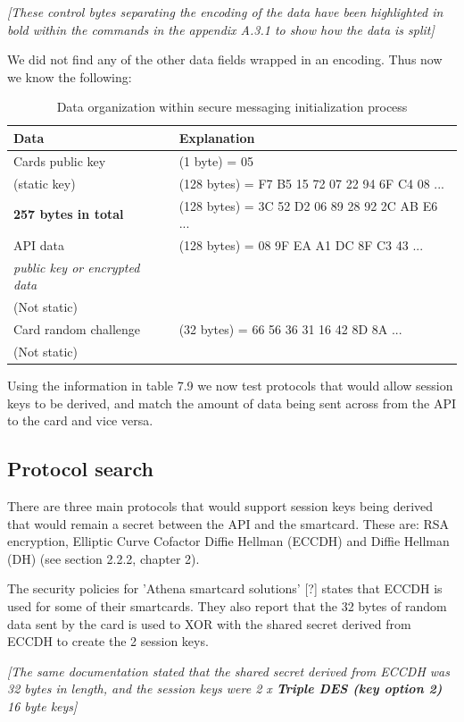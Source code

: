 \documentclass[bsc,frontabs,twoside,singlespacing,parskip,deptreport]{infthesis}     %
\begin{document}
\textit{[These control bytes separating the encoding of the data have been highlighted in bold within the commands in the appendix A.3.1 to show how the data is split]}

We did not find any of the other data fields wrapped in an encoding. Thus now we know the following:

\begin{table}[H]
\begin{tabular}{|l|l|}
\hline
Data & Explanation\\
\hline
Cards public key & (1 byte) = 05\\
(static key)    & (128 bytes) = F7 B5  15 72 07 22 94 6F C4 08 ...\\
\textbf{257 bytes in total} & (128 bytes) = 3C 52 D2 06 89 28 92 2C AB E6 ...\\
\hline
API data & (128 bytes) = 08 9F EA  A1 DC 8F C3 43 ...\\
\textit{public key or encrypted data} & \\
(Not static) & \\
\hline
Card random challenge & (32 bytes) = 66 56 36 31 16 42 8D 8A ...\\
(Not static) & \\
\hline
\end{tabular}
\caption{Data organization within secure messaging initialization process}
\end{table}

Using the information in table 7.9 we now test protocols that would allow session keys to be derived, and match the amount of data being sent across from the API to the card and vice versa.

\subsection{Protocol search}
There are three main protocols that would support session keys being derived that would remain a secret between the API and the smartcard. These are: RSA encryption, Elliptic Curve Cofactor Diffie Hellman (ECCDH) and Diffie Hellman (DH) (see section 2.2.2, chapter 2). 

The security policies for 'Athena smartcard solutions' [?] states that ECCDH is used for some of their smartcards. They also report that the 32 bytes of random data sent by the card is used to XOR with the shared secret derived from ECCDH to create the 2 session keys. 

\textit{[The same documentation stated that the shared secret derived from ECCDH was 32 bytes in length, and the session keys were 2 x  \textbf{Triple DES (key option 2)} 16 byte keys]}
\end{document}
